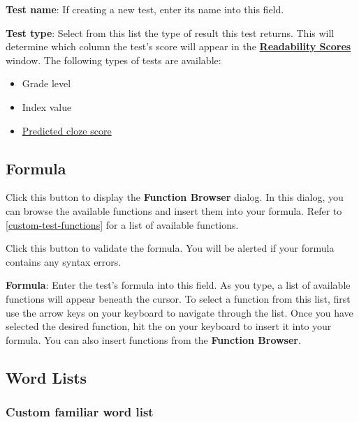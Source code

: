 \documentclass[
]{book}
\providecommand{\tightlist}{%
  \setlength{\itemsep}{0pt}\setlength{\parskip}{0pt}}
\theoremstyle{definition}
\theoremstyle{definition}
\theoremstyle{definition}
\theoremstyle{definition}
\theoremstyle{remark}
\begin{document}
\textbf{Test name}: If creating a new test, enter its name into this field.

\begin{minipage}{\textwidth}

\textbf{Test type}: Select from this list the type of result this test returns. This will determine which column the test's score will appear in the \protect\hyperlink{reviewing-test-scores}{\textbf{Readability Scores}} window. The following types of tests are available:

\begin{itemize}
\tightlist
\item
  Grade level
\item
  Index value
\item
  \protect\hyperlink{cloze}{Predicted cloze score}
\end{itemize}

\end{minipage}

\hypertarget{formula}{%
\subsection*{Formula}\label{formula}}

 Click this button to display the \textbf{Function Browser} dialog. In this dialog, you can browse the available functions and insert them into your formula. Refer to \ref{custom-test-functions} for a list of available functions.

\keys{\Checkmark} Click this button to validate the formula. You will be alerted if your formula contains any syntax errors.

\textbf{Formula}: Enter the test's formula into this field. As you type, a list of available functions will appear beneath the cursor. To select a function from this list, first use the arrow keys on your keyboard to navigate through the list. Once you have selected the desired function, hit the  on your keyboard to insert it into your formula. You can also insert functions from the \textbf{Function Browser}.

\hypertarget{word-lists}{%
\subsection*{Word Lists}\label{word-lists}}

\hypertarget{custom-word-list}{%
\subsubsection*{Custom familiar word list}\label{custom-word-list}}
\end{document}
